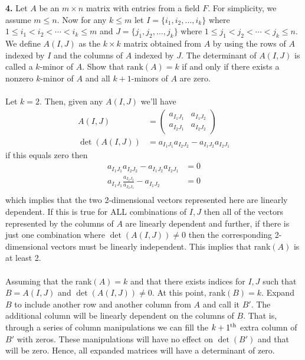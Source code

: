 \documentclass[11pt]{amsart}
\theoremstyle{definition}  %
\newcommand{\rank}{\mathrm{rank}}
\begin{document}
\newpage
\vskip 0.1cm
\noindent
{\bf 4.} Let $A$ be an $m \times n$ matrix with entries from a field $F$. For simplicity, we assume $m \leq n$. Now for any $k \leq m$ let $I = \{i_1, i_2, \ldots, i_k\}$ where $
1 \leq i_1 < i_2 < \cdots < i_k \leq m$ and $J = \{j_1, j_2, \ldots, j_k\}$ where $1 \leq j_1 < j_2 < \cdots < j_k \leq n$. We define $A(I,J)$ as the $k \times k$ matrix obtained from 
$A$ by using the rows of $A$ indexed by $I$ and the columns of $A$ indexed by $J$. The determinant of $A(I,J)$ is called a $k$-minor of $A$. Show that $\rank(A)  = k$ 
if and only if there exists a nonzero $k$-minor of $A$ and all $k+1$-minors of $A$ are zero. \\
\\
Let $k=2$.  Then, given any $A(I,J)$ we'll have
\begin{align*}
	A(I,J) &= \begin{pmatrix}
		a_{I_1J_1} & a_{I_1J_2} \\
		a_{I_2J_1} & a_{I_2J_2}
	\end{pmatrix} \\
	\det(A(I,J)) &= a_{I_1J_1}a_{I_2J_2}-a_{I_1J_2}a_{I_2J_1}
\end{align*}if this equals zero then
\begin{align*}
	a_{I_1J_1}a_{I_2J_2}-a_{I_1J_2}a_{I_2J_1} &=0 \\
	a_{I_1J_1}\frac{a_{I_2J_2}}{a_{I_2J_1}}-a_{I_1J_2}&=0\\
\end{align*}which implies that the two 2-dimensional vectors represented here are linearly dependent.  If this is true for ALL combinations of $I,J$ then all of the vectors represented by the columns of $A$ are linearly dependent and further, if there is just one combination where $\det(A(I,J)) \ne 0$ then the corresponding 2-dimensional vectors must be linearly independent.  This implies that rank$(A)$ is at least 2.\\
\\
Assuming that the rank$(A) = k$ and that there exists indices for $I,J$ such that $B=A(I,J)$ and $\det(A(I,J)) \ne 0$.  At this point, rank$(B) = k$.  Expand $B$ to include another row and another column from $A$ and call it $B'$.  The additional column will be linearly dependent on the columns of $B$.  That is, through a series of column manipulations we can fill the $k+1\textsuperscript{th}$ extra column of $B'$ with zeros.  These manipulations will have no effect on $\det(B')$ and that will be zero.  Hence, all expanded matrices will have a determinant of zero.
\end{document}
